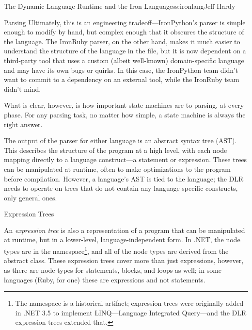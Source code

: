 \begin{aosachapter}{The Dynamic Language Runtime and the Iron Languages}{s:ironlang}{Jeff Hardy}
\begin{aosasect1}{Parsing}
Ultimately, this is an engineering tradeoff---IronPython's parser is simple
enough to modify by hand, but complex enough that it obscures the structure of
the language. The IronRuby parser, on the other hand, makes it much easier to
understand the structure of the language in the  file, but it is
now dependent on a third-party tool that uses a custom (albeit well-known)
domain-specific language and may have its own bugs or quirks. In this case, the
IronPython team didn't want to commit to a dependency on an external tool, 
while the
IronRuby team didn't mind.

What is clear, however, is how important state machines are to parsing, at
every phase. For any parsing task, no matter how simple, a state machine is
always the right answer.

The output of the parser for either language is an abstract syntax tree (AST).
This describes the structure of the program at a high level, with each node
mapping directly to a language construct---a statement or expression.  These
trees can be manipulated at runtime, often to make optimizations to the program
before compilation. However, a language's AST is tied to the language; the DLR
needs to operate on trees that do not contain any language-specific constructs,
only general ones.

\end{aosasect1}

\begin{aosasect1}{Expression Trees}

An \emph{expression tree} is also a representation of a program that can be
manipulated at runtime, but in a lower-level, language-independent form. In
.NET, the node types are in the 
namespace\footnote{The namespace is a historical artifact; expression trees
were originally added in .NET 3.5 to implement LINQ---Language Integrated
Query---and the DLR expression trees extended that.}, and all of the node types
are derived from the abstract  class. These expression trees
cover more than just expressions, however, as there are node types for
 statements,  blocks, and loops as well; in some languages
(Ruby, for one) these are expressions and not statements.


\end{aosasect1}
\end{aosachapter}
